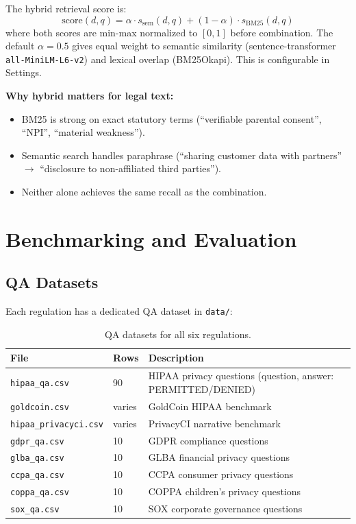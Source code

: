 \documentclass[11pt,letterpaper]{article}
\begin{document}
\begin{appendices}
The hybrid retrieval score is:
\[
\text{score}(d, q) = \alpha \cdot s_{\text{sem}}(d, q) + (1-\alpha) \cdot s_{\text{BM25}}(d, q)
\]
where both scores are min-max normalized to $[0,1]$ before combination. The default $\alpha = 0.5$ gives equal weight to semantic similarity (sentence-transformer \texttt{all-MiniLM-L6-v2}) and lexical overlap (BM25Okapi). This is configurable in Settings.

\textbf{Why hybrid matters for legal text:}
\begin{itemize}
  \item BM25 is strong on exact statutory terms (``verifiable parental consent'', ``NPI'', ``material weakness'').
  \item Semantic search handles paraphrase (``sharing customer data with partners'' $\to$ ``disclosure to non-affiliated third parties'').
  \item Neither alone achieves the same recall as the combination.
\end{itemize}


\section{Benchmarking and Evaluation}
\label{sec:benchmarking}

\subsection{QA Datasets}

Each regulation has a dedicated QA dataset in \texttt{data/}:

\begin{table}[H]
\centering
\begin{tabularx}{\textwidth}{llX}
\toprule
\textbf{File} & \textbf{Rows} & \textbf{Description} \\
\midrule
\texttt{hipaa\_qa.csv} & 90 & HIPAA privacy questions (question, answer: PERMITTED/DENIED) \\
\texttt{goldcoin.csv} & varies & GoldCoin HIPAA benchmark \\
\texttt{hipaa\_privacyci.csv} & varies & PrivacyCI narrative benchmark \\
\texttt{gdpr\_qa.csv} & 10 & GDPR compliance questions \\
\texttt{glba\_qa.csv} & 10 & GLBA financial privacy questions \\
\texttt{ccpa\_qa.csv} & 10 & CCPA consumer privacy questions \\
\texttt{coppa\_qa.csv} & 10 & COPPA children's privacy questions \\
\texttt{sox\_qa.csv} & 10 & SOX corporate governance questions \\
\bottomrule
\end{tabularx}
\caption{QA datasets for all six regulations.}
\end{table}


\end{appendices}
\end{document}
